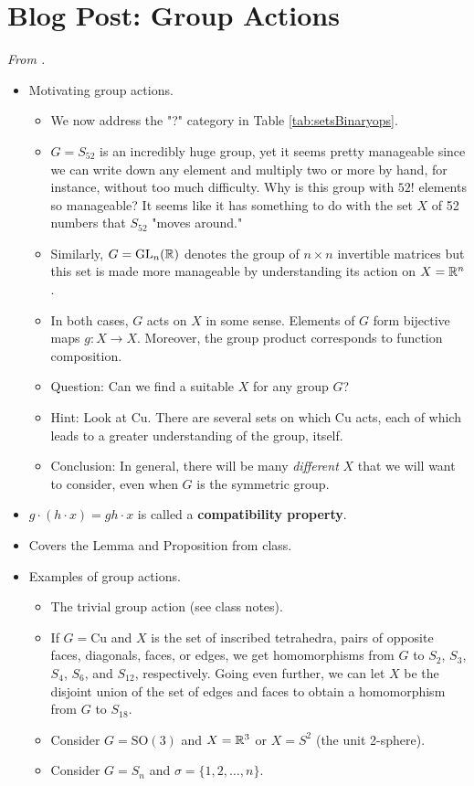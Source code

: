 \documentclass[../notes.tex]{subfiles}
\begin{document}
\section{Blog Post: Group Actions}
\emph{From \textcite{bib:Calegari}.}
\begin{itemize}
    \item {}Motivating group actions.
    \begin{itemize}
        \item We now address the "?" category in Table \ref{tab:setsBinaryops}.
        \item $G=S_{52}$ is an incredibly huge group, yet it seems pretty manageable since we can write down any element and multiply two or more by hand, for instance, without too much difficulty. Why is this group with $52!$ elements so manageable? It seems like it has something to do with the set $X$ of 52 numbers that $S_{52}$ "moves around."
        \item Similarly, $G=\text{GL}_n(\mathbb{R})$ denotes the group of $n\times n$ invertible matrices but this set is made more manageable by understanding its action on $X=\mathbb{R}^n$.
        \item In both cases, $G$ acts on $X$ in some sense. Elements of $G$ form bijective maps $g:X\to X$. Moreover, the group product corresponds to function composition.
        \item Question: Can we find a suitable $X$ for any group $G$?
        \item Hint: Look at $\text{Cu}$. There are several sets on which $\text{Cu}$ acts, each of which leads to a greater understanding of the group, itself.
        \item Conclusion: In general, there will be many \emph{different} $X$ that we will want to consider, even when $G$ is the symmetric group.
    \end{itemize}
    \item $g\cdot(h\cdot x)=gh\cdot x$ is called a \textbf{compatibility property}.
    \item Covers the Lemma and Proposition from class.
    \item Examples of group actions.
    \begin{itemize}
        \item The trivial group action (see class notes).
        \item If $G=\text{Cu}$ and $X$ is the set of inscribed tetrahedra, pairs of opposite faces, diagonals, faces, or edges, we get homomorphisms from $G$ to $S_2$, $S_3$, $S_4$, $S_6$, and $S_{12}$, respectively. Going even further, we can let $X$ be the disjoint union of the set of edges and faces to obtain a homomorphism from $G$ to $S_{18}$.
        \item Consider $G=\text{SO}(3)$ and $X=\mathbb{R}^3$ or $X=S^2$ (the unit 2-sphere).
        \item Consider $G=S_n$ and $\sigma=\{1,2,\dots,n\}$.
    \end{itemize}
\end{itemize}
\end{document}
